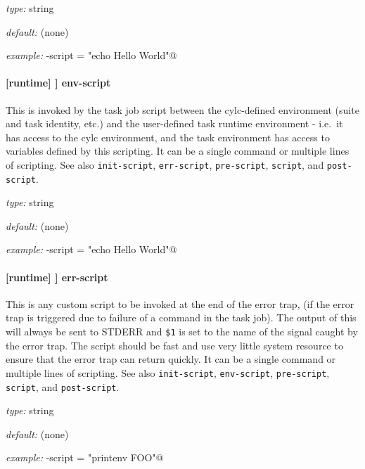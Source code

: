 \begin{myitemize}
\item {\em type:} string
\item {\em default:} (none)
\item {\em example:} \lstinline@init-script = "echo Hello World"@
\end{myitemize}

\paragraph[env-script]{[runtime] \textrightarrow [[\_\_NAME\_\_]] \textrightarrow env-script}

This is invoked by the task job script between the cylc-defined environment
(suite and task identity, etc.) and the user-defined task runtime environment -
i.e.\ it has access to the cylc environment, and the task environment has
access to variables defined by this scripting. It can be a single command or
multiple lines of scripting.  See also \lstinline=init-script=,
\lstinline=err-script=, \lstinline=pre-script=, \lstinline=script=, and
\lstinline=post-script=.

\begin{myitemize}
\item {\em type:} string
\item {\em default:} (none)
\item {\em example:} \lstinline@env-script = "echo Hello World"@
\end{myitemize}

\paragraph[err-script]{[runtime] \textrightarrow [[\_\_NAME\_\_]] \textrightarrow err-script}

This is any custom script to be invoked at the end of the error trap, (if the
error trap is triggered due to failure of a command in the task job). The
output of this will always be sent to STDERR and \lstinline=$1= is set to the
name of the signal caught by the error trap. The script should be fast and use
very little system resource to ensure that the error trap can return quickly.
It can be a single command or multiple lines of scripting. See also
\lstinline=init-script=, \lstinline=env-script=, \lstinline=pre-script=,
\lstinline=script=, and \lstinline=post-script=.

\begin{myitemize}
\item {\em type:} string
\item {\em default:} (none)
\item {\em example:} \lstinline@err-script = "printenv FOO"@
\end{myitemize}

